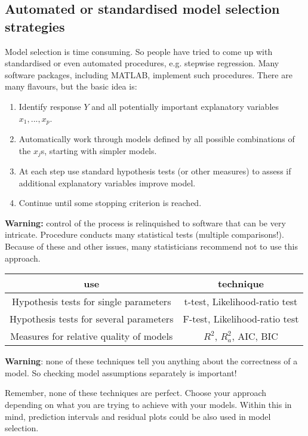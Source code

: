 \subsection{Automated or standardised model selection strategies}

Model selection is time consuming. So people have tried to come up with standardised or even automated procedures, e.g. stepwise regression. Many software packages, including MATLAB, implement such procedures. There are many flavours, but the basic idea is:
\begin{enumerate}[label=\textbf{\arabic*.}]
	\item Identify response $Y$ and all potentially important explanatory variables $x_1,...,x_p$.
	\item Automatically work through models defined by all possible combinations of the $x_j$s, starting with simpler models.
	\item At each step use standard hypothesis tests (or other measures) to assess if additional explanatory variables improve model.
	\item Continue until some stopping criterion is reached.
\end{enumerate}

\textbf{Warning:} control of the process is relinquished to software that can be very intricate. Procedure conducts many statistical tests (multiple comparisons!). Because of these and other issues, many statisticians recommend not to use this approach.

\begin{center}
	\begin{tabular}{c|c}
		\textbf{use} & \textbf{technique} \\
		\hline
		Hypothesis tests for single parameters & t-test, Likelihood-ratio test \\
		Hypothesis tests for several parameters & F-test, Likelihood-ratio test \\
		Measures for relative quality of models & $R^2$, $R^2_a$, AIC, BIC
	\end{tabular}
\end{center}

\textbf{Warning}: none of these techniques tell you anything about the correctness of a model. So checking model assumptions separately is important!

Remember, none of these techniques are perfect. Choose your approach depending on what you are trying to achieve with your models. Within this in mind, prediction intervals and residual plots could be also used in model selection.